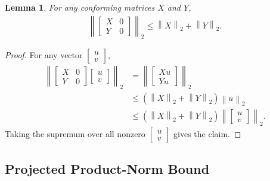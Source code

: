 \documentclass[letterpaper]{article}
\numberwithin{equation}{section}
\newtheorem{lemma}{Lemma}[section]
\begin{document}
\begin{lemma}
\label{lem:block-column-norm-bound}
For any conforming matrices $X$ and $Y$,
\begin{align*}
  \left\lVert
    \begin{bmatrix}X&0\\Y&0\end{bmatrix}
  \right\rVert_2
  \le \left\lVert X\right\rVert_2+\left\lVert Y\right\rVert_2.
\end{align*}
\end{lemma}
\begin{proof}
For any vector $\begin{bmatrix}u\\v\end{bmatrix}$,
\begin{align*}
  \left\lVert
  \begin{bmatrix}X&0\\Y&0\end{bmatrix}
  \begin{bmatrix}u\\v\end{bmatrix}
  \right\rVert_2
  &=
  \left\lVert
  \begin{bmatrix}Xu\\Yu\end{bmatrix}
  \right\rVert_2 \\
  &\le
  \left(\left\lVert X\right\rVert_2+\left\lVert Y\right\rVert_2\right)
  \left\lVert u\right\rVert_2 \\
  &\le
  \left(\left\lVert X\right\rVert_2+\left\lVert Y\right\rVert_2\right)
  \left\lVert\begin{bmatrix}u\\v\end{bmatrix}\right\rVert_2.
\end{align*}
Taking the supremum over all nonzero $\begin{bmatrix}u\\v\end{bmatrix}$ gives the claim.
\end{proof}

\subsection{Projected Product-Norm Bound}
\label{app:projected-product-norm-bound}
\end{document}
